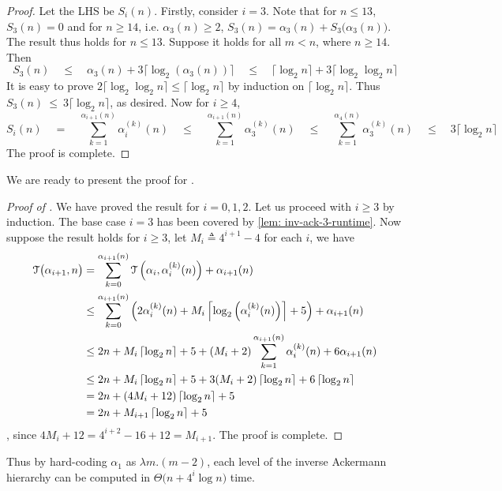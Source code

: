 \begin{proof}
	Let the LHS be $S_i(n)$. Firstly, consider $i = 3$. Note that for $n\le 13$, $S_3(n) = 0$ and for $n\ge 14$, i.e. $\alpha_3(n)\ge 2$, $S_3(n) = \alpha_3(n) + S_3\big(\alpha_3(n)\big)$. The result thus holds for $n\le 13$. Suppose it holds for all $m < n$, where $n\ge 14$. Then
	\begin{equation*}
	S_3(n) \quad \le \quad \alpha_3(n) + 3\big\lceil \log_2(\alpha_3(n)) \big\rceil \quad \le \quad \big\lceil \log_2n \big\rceil + 3\big\lceil \log_2\log_2n \big\rceil
	\end{equation*}
	It is easy to prove $2\big\lceil \log_2\log_2n \big\rceil \le \big\lceil \log_2n \big\rceil$ by induction on $\big\lceil \log_2n \big\rceil$. Thus $S_3(n)~\le~3\big\lceil \log_2n \big\rceil$, as desired. Now for $i \ge 4$,
	\begin{equation*}
	S_i(n) \quad = \quad \sum_{k=1}^{\alpha_{i+1}(n)} \alpha_i^{(k)}(n) \quad \le \quad 
	\sum_{k=1}^{\alpha_{i+1}(n)} \alpha_3^{(k)}(n) \quad \le \quad 
	\sum_{k=1}^{\alpha_{4}(n)} \alpha_3^{(k)}(n) \quad \le \quad 
	3\big\lceil \log_2n \big\rceil
	\end{equation*}
	The proof is complete.	
\end{proof}
We are ready to present the proof for .
\begin{proof}[Proof of ]
	We have proved the result for $i = 0, 1, 2$. Let us proceed with $i\ge 3$ by induction. The base case $i = 3$ has been covered by \cref{lem: inv-ack-3-runtime}. Now suppose the result holds for $i\ge 3$, let $M_i \triangleq 4^{i+1}-4$ for each $i$, we have
	\begin{equation*}
	\begin{aligned}
	\mathcal{T}\big(\alpha_{i+1}, n\big) & = \sum_{k=0}^{\alpha_{i+1}(n)} \mathcal{T}\left(\alpha_i, \alpha_i^{(k)}(n)\right) + \alpha_{i+1}(n) \\
	& \le \sum_{k=0}^{\alpha_{i+1}(n)}\left(2\alpha_i^{(k)}(n) + M_i\left\lceil\log_2\left(\alpha_i^{(k)}(n)\right)\right\rceil + 5 \right) + \alpha_{i+1}(n) \\
	& \le 2n + M_i\left\lceil\log_2n\right\rceil + 5 + (M_i+2)\sum_{k=1}^{\alpha_{i+1}(n)}\alpha_i^{(k)}(n) + 6\alpha_{i+1}(n) \\
	& \le 2n + M_i\left\lceil\log_2n\right\rceil + 5 +
	3(M_i + 2)\left\lceil\log_2n\right\rceil + 6\left\lceil\log_2n\right\rceil \\
	& = 2n + (4M_i + 12)\left\lceil\log_2n\right\rceil + 5 \\
	& = 2n + M_{i+1}\left\lceil\log_2n\right\rceil + 5
	\end{aligned}
	\end{equation*}
	, since $4M_i + 12 = 4^{i+2} - 16 + 12 = M_{i+1}$. The proof is complete.
\end{proof}
Thus by hard-coding $\alpha_1$ as $\lambda m.(m-2)$, each level of the inverse Ackermann hierarchy can be computed in $\Theta\big(n + 4^i\log n\big)$ time.

